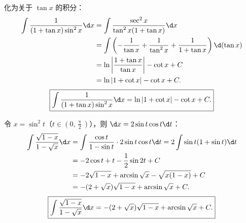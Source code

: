 \begin{solution}
    化为关于 $\tan x$ 的积分：
    \begin{equation}
        \begin{aligned}
            \int \frac{1}{(1 + \tan x)\sin^2 x} \d x & = \int \frac{\sec^2 x}{\tan^2 x(1 + \tan x)} \d x                                              \\
                                                     & = \int \left( -\frac{1}{\tan x} + \frac{1}{\tan^2 x} + \frac{1}{1 + \tan x} \right) \d(\tan x) \\
                                                     & = \ln\left| \frac{1 + \tan x}{\tan x} \right| - \cot x + C                                     \\
                                                     & = \ln|1 + \cot x| - \cot x + C.
        \end{aligned}
    \end{equation}
    \begin{equation}
        \boxed{\int \frac{1}{(1 + \tan x)\sin^2 x} \d x = \ln|1 + \cot x| - \cot x + C.}
    \end{equation}


    令 $x = \sin^2 t$（$t \in \left(0, \frac{\uppi}{2}\right)$），则 $\d x = 2\sin t \cos t \d t$：
    \begin{equation}
        \begin{aligned}
            \int \frac{\sqrt{1 - x}}{1 - \sqrt{x}} \d x & = \int \frac{\cos t}{1 - \sin t} \cdot 2\sin t \cos t \d t = 2\int \sin t(1 + \sin t) \d t \\
                                                        & = -2\cos t + t - \frac{1}{2}\sin 2t + C                                                    \\
                                                        & = -2\sqrt{1 - x} + \arcsin\sqrt{x} - \sqrt{x(1 - x)} + C                                   \\
                                                        & = -(2 + \sqrt{x})\sqrt{1 - x} + \arcsin\sqrt{x} + C.
        \end{aligned}
    \end{equation}
    \begin{equation}
        \boxed{\int \frac{\sqrt{1 - x}}{1 - \sqrt{x}} \d x = -(2 + \sqrt{x})\sqrt{1 - x} + \arcsin\sqrt{x} + C.}
    \end{equation}



\end{solution}
